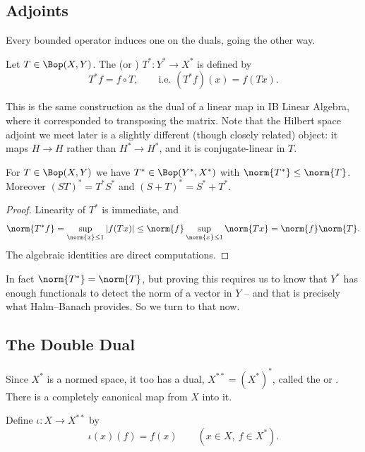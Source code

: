 \subsection{Adjoints}

Every bounded operator induces one on the duals, going the other way.

\begin{definition}[Adjoint]
	Let $T \in \Bop(X,Y)$. The  (or ) $T^* : Y^* \to X^*$ is defined by
	$$T^* f = f \circ T, \qquad \text{i.e.\ } (T^*f)(x) = f(Tx).$$
\end{definition}

This is the same construction as the dual of a linear map in IB Linear Algebra, where it corresponded to transposing the matrix. Note that the Hilbert space adjoint we meet later is a slightly different (though closely related) object: it maps $H \to H$ rather than $H^* \to H^*$, and it is conjugate-linear in $T$.

\begin{proposition}
	For $T \in \Bop(X,Y)$ we have $T^* \in \Bop(Y^*, X^*)$ with $\norm{T^*} \leq \norm{T}$. Moreover $(ST)^* = T^*S^*$ and $(S+T)^* = S^* + T^*$.
\end{proposition}

\begin{proof}
	Linearity of $T^*$ is immediate, and
	$$\norm{T^*f} = \sup_{\norm{x}\leq 1} |f(Tx)| \leq \norm{f} \sup_{\norm{x} \leq 1}\norm{Tx} = \norm{f}\norm{T}.$$
	The algebraic identities are direct computations.
\end{proof}

In fact $\norm{T^*} = \norm{T}$, but proving this requires us to know that $Y^*$ has enough functionals to detect the norm of a vector in $Y$ -- and that is precisely what Hahn--Banach provides. So we turn to that now.

\subsection{The Double Dual}

Since $X^*$ is a normed space, it too has a dual, $X^{**} = (X^*)^*$, called the  or . There is a completely canonical map from $X$ into it.

\begin{definition}
	Define $\iota : X \to X^{**}$ by
	$$\iota(x)(f) = f(x) \qquad (x \in X, \ f \in X^*).$$
\end{definition}

